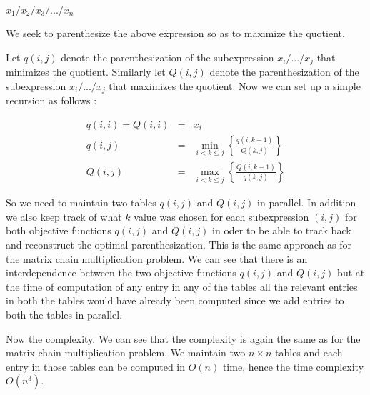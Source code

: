 
\begin{center}
$x_1/x_2/x_3/ . . . /x_n$
\end{center}

We seek to parenthesize the above expression so as to maximize the quotient.

Let $q(i, j)$ denote the parenthesization of the subexpression $x_i/ . . . /x_j$ that minimizes the quotient. Similarly let $Q(i, j)$ denote the parenthesization of the subexpression $x_i/ . . . /x_j$ that maximizes the quotient. Now we can set up a simple recursion as follows :

\[
\begin{array}{rcl}
 q(i, i) = Q(i, i) & = & x_i \\
 q(i, j) & = & \min\limits_{i < k \leq j} \left\{\frac{q(i, k-1)}{Q(k, j)}\right\} \\
 Q(i, j) & = & \max\limits_{i < k \leq j} \left\{\frac{Q(i, k-1)}{q(k, j)}\right\}
\end{array}
\]

So we need to maintain two tables $q(i,j)$ and $Q(i,j)$ in parallel. In addition we also keep track of what $k$ value was chosen for each subexpression $(i, j)$ for both objective functions  $q(i,j)$ and $Q(i,j)$ in oder to be able to track back and reconstruct the optimal parenthesization. This is the same approach as for the matrix chain multiplication problem. 
We can see that there is an interdependence between the two objective functions  $q(i,j)$ and $Q(i,j)$ but at the time of computation of any entry in any of the tables all the relevant entries in both the tables would have already been computed since we add entries to both the tables in parallel.


Now the complexity. We can see that the complexity is again the same as for the matrix chain multiplication problem. We maintain two $n \times n$ tables and each entry in those tables can be computed in $O(n)$ time, hence the time complexity $O(n^3)$.




